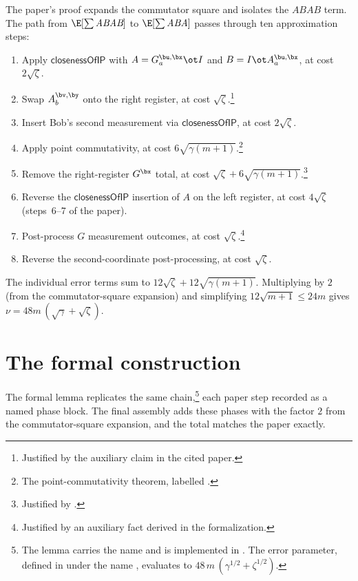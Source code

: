 \documentclass{article}
\newcommand{\ABAB}{\textit{ABAB}}
\newcommand{\ABA}{\textit{ABA}}
\newcommand{\closenessOfIP}{\textsf{closenessOfIP}}
\begin{document}
The paper's proof expands the commutator square and isolates the
$\ABAB$ term. The path from $\E[\sum \ABAB]$ to $\E[\sum \ABA]$
passes through ten approximation steps:
\begin{enumerate}
  \item Apply $\closenessOfIP$ with $A = G^{\bu,\bx}_a \ot I$ and
    $B = I \ot A^{\bu,\bx}_a$, at cost $2\sqrt{\zeta}$.
  \item Swap $A^{\bv,\by}_b$ onto the right register, at cost
    $\sqrt{\zeta}$.\footnote{Justified by the auxiliary claim
     in the cited paper.}
  \item Insert Bob's second measurement via $\closenessOfIP$, at cost
    $2\sqrt{\zeta}$.
  \item Apply point commutativity, at cost
    $6\sqrt{\gamma(m+1)}$.\footnote{The point-commutativity theorem,
    labelled .}
  \item Remove the right-register $G^{\bx}$ total, at cost
    $\sqrt{\zeta} + 6\sqrt{\gamma(m+1)}$.\footnote{Justified by
    .}
  \item Reverse the $\closenessOfIP$ insertion of $A$ on the left
    register, at cost $4\sqrt{\zeta}$ (steps~6--7 of the paper).
  \item Post-process $G$ measurement outcomes, at cost
    $\sqrt{\zeta}$.\footnote{Justified by an auxiliary fact derived
    in the formalization.}
  \item Reverse the second-coordinate post-processing, at cost
    $\sqrt{\zeta}$.
\end{enumerate}
The individual error terms sum to
$12\sqrt{\zeta} + 12\sqrt{\gamma(m+1)}$. Multiplying by $2$ (from
the commutator-square expansion) and simplifying $12\sqrt{m+1} \leq
24m$ gives $\nu = 48m\,(\sqrt{\gamma}+\sqrt{\zeta})$.

\section{The formal construction}

The formal lemma replicates the same chain,\footnote{The lemma
carries the name  and is
implemented in
. The error parameter, defined in
 under the name
, evaluates to
$48\,m\,(\gamma^{1/2} + \zeta^{1/2})$.}
each paper step recorded as a named phase block. The final assembly
adds these phases with the factor $2$ from the commutator-square
expansion, and the total matches the paper exactly.
\end{document}
